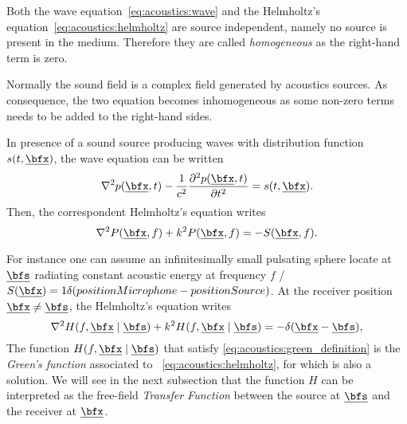 Both the wave equation~\ref{eq:acoustics:wave} and the Helmholtz's equation~\ref{eq:acoustics:helmholtz} are source independent,
namely no source is present in the medium.
Therefore they are called \textit{homogeneous} as the right-hand term is zero.

Normally the sound field is a complex field generated by acoustics sources.
As consequence, the two equation becomes inhomogeneous as some non-zero terms needs to be added to the right-hand sides.

In presence of a sound source producing waves with distribution function $s(t, \positionMicrophone)$, the wave equation can be written
\begin{equation}
    \label{eq:acoustics:source}
    \knabla^2 \pressureSpaceTime - \frac{1}{\speedOfSound^2} \kpderiv[2]{\pressureSpaceTime}{t} = s(t, \positionMicrophone)
    .
\end{equation}
Then, the correspondent Helmholtz's equation writes
\begin{equation}
    \label{eq:acoustics:source_freq}
    \knabla^2 P(\positionMicrophone, f) + k^2 P(\positionMicrophone, f) = - S(\positionMicrophone, f)
    .
\end{equation}

For instance one can assume an infinitesimally small pulsating sphere locate at $\positionSource$ radiating constant acoustic energy at frequency $f$
\ie/ $S(\positionMicrophone) = 1 \delta(positionMicrophone - positionSource)$.
At the receiver position $\positionMicrophone \neq \positionSource$, the Helmholtz's equation writes
\begin{equation}
    \label{eq:acoustics:green_definition}
    \knabla^2 H(f, \positionMicrophone \mid \positionSource)
     + k^2 H(f, \positionMicrophone \mid \positionSource) = - \delta(\positionMicrophone - \positionSource)
    ,
\end{equation}
The function $H(f, \positionMicrophone \mid \positionSource)$ that satisfy \cref{eq:acoustics:green_definition} is the \textit{Green's function}
associated to ~\cref{eq:acoustics:helmholtz}, for which is also a solution.
We will see in the next subsection that the function $H$ can be interpreted as the free-field \textit{Transfer Function}
between the source at $\positionSource$ and the receiver at $\positionMicrophone$.

